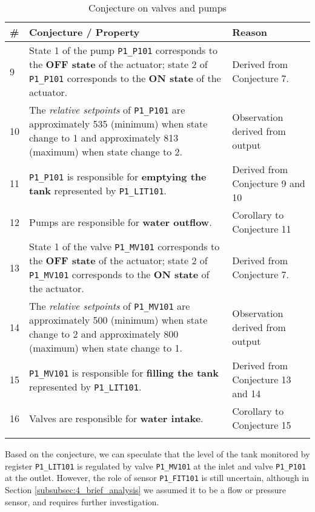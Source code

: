 {
	\small
	\begin{longtable}[l]{p{} p{} p{}}
		\hline
		\textbf{\#} & \textbf{Conjecture / Property} & \textbf{Reason} \\
		\hline
		
		9 & State 1 of the pump \texttt{P1\_P101} corresponds to the \textbf{OFF state} of the actuator; state 2 of \texttt{P1\_P101} corresponds to the \textbf{ON state} of the actuator. & Derived from Conjecture 7.\\ 
		\hline
				
		10 & The \textit{relative setpoints} of \texttt{P1\_P101} are approximately 535 (minimum) when state change to 1 and approximately 813 (maximum) when state change to 2. & Observation derived from output\\
		\hline
		
		11 & \texttt{P1\_P101} is responsible for \textbf{emptying the tank} represented by \texttt{P1\_LIT101}. & Derived from Conjecture 9 and 10 \\
		\hline
		
		12 & Pumps are responsible for \textbf{water outflow}. & Corollary to Conjecture 11\\
		\hline		
		
		13 & State 1 of the valve \texttt{P1\_MV101} corresponds to the \textbf{OFF state} of the actuator; state 2 of \texttt{P1\_MV101} corresponds to the \textbf{ON state} of the actuator. & Derived from Conjecture 7.\\
		\hline
		
		14 & The \textit{relative setpoints} of \texttt{P1\_MV101} are approximately 500 (minimum) when state change to 2 and approximately 800 (maximum) when state change to 1. & Observation derived from output\\
		\hline
		
		15 & \texttt{P1\_MV101} is responsible for \textbf{filling the tank} represented by \texttt{P1\_LIT101}. & Derived from Conjecture 13 and 14 \\
		\hline
		
		16 & Valves are responsible for \textbf{water intake}. & Corollary to Conjecture 15\\
		\hline

		\caption{Conjecture on valves and pumps}
		\label{table:6_p1p2_p101}
	\end{longtable}
}

\noindent Based on the conjecture, we can speculate that the level of the tank monitored by register \texttt{P1\_LIT101} is regulated by valve \texttt{P1\_MV101} at the inlet and valve \texttt{P1\_P101} at the outlet. However, the role of sensor \texttt{P1\_FIT101} is still uncertain, although in Section \ref{subsubsec:4_brief_analysis} we assumed it to be a flow or pressure sensor, and requires further investigation.

